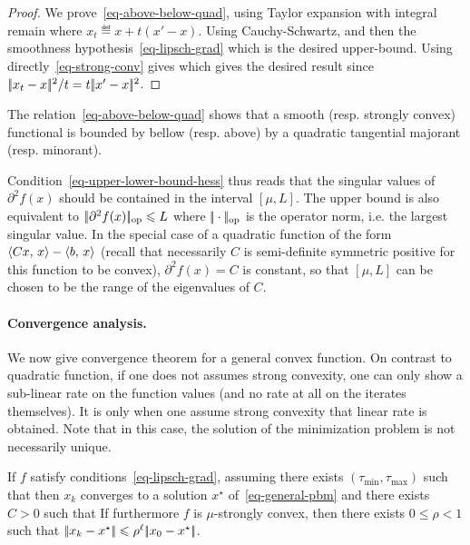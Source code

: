 \begin{proof}
	We prove~\eqref{eq-above-below-quad}, using Taylor expansion with integral remain
	where $x_t \eqdef x+t(x'-x)$.
	Using Cauchy-Schwartz, and then the smoothness hypothesis~\eqref{eq-lipsch-grad}
	which is the desired upper-bound. Using directly~\eqref{eq-strong-conv} gives 
	which gives the desired result since $|\!| x_t-x |\!|^2 / t = t |\!| x'-x |\!|^2$.
\end{proof}

The relation~\eqref{eq-above-below-quad} shows that a smooth (resp. strongly convex) functional is bounded by bellow (resp. above) by a quadratic tangential majorant (resp. minorant). 

Condition~\eqref{eq-upper-lower-bound-hess} thus reads that the singular values of $\partial^2 f(x)$ should be contained in the interval $[\mu,L]$. The upper bound is also equivalent to $|\!| \partial^2 f(x) |\!|_{\text{op}} \leqslant L$ where $|\!| \cdot |\!|_{\text{op}}$ is the operator norm, i.e. the largest singular value. 
%
In the special case of a quadratic function of the form $\langle Cx,\,x\rangle-\langle b,\,x\rangle$ (recall that necessarily $C$ is semi-definite symmetric positive for this function to be convex), $\partial^2 f(x)=C$ is constant, so that $[\mu,L]$ can be chosen to be the range of the eigenvalues of $C$.

\paragraph{Convergence analysis.}

We now give convergence theorem for a general convex function. On contrast to quadratic function, if one does not assumes strong convexity, one can only show a sub-linear rate on the function values (and no rate at all on the iterates themselves). It is only when one assume strong convexity that linear rate is obtained. 
%
Note that in this case, the solution of the minimization problem is not necessarily unique.

\begin{thm}\label{thm-gradsec-non-strong-conv}
	If $f$ satisfy conditions~\eqref{eq-lipsch-grad}, assuming there exists $(\tau_{\min},\tau_{\max})$ such that
	then $x_k$ converges to a solution $x^\star$ of~\eqref{eq-general-pbm} and
	there exists $C>0$ such that 
	If furthermore $f$ is $\mu$-strongly convex, then there exists $0 \leq \rho < 1$ such that $|\!| x_k-x^\star |\!| \leqslant \rho^\ell |\!| x_0-x^\star |\!|$.
\end{thm}

